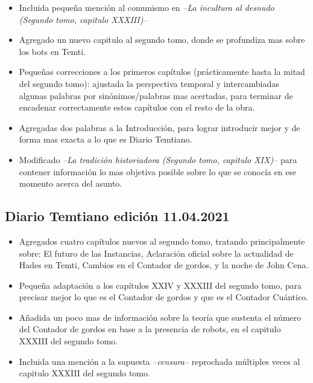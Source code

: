 \documentclass[
]{book}
\begin{document}
\begin{itemize}
\item[$\boxtimes$]
  Incluida pequeña mención al comunismo en \emph{--La incultura al desnudo (Segundo tomo, capitulo XXXIII)--}
\item[$\boxtimes$]
  Agregado un nuevo capitulo al segundo tomo, donde se profundiza mas sobre los bots en Temti.
\item[$\boxtimes$]
  Pequeñas correcciones a los primeros capítulos (prácticamente hasta la mitad del segundo tomo): ajustada la perspectiva temporal y intercambiadas algunas palabras por sinónimos/palabras mas acertadas, para terminar de encadenar correctamente estos capítulos con el resto de la obra.
\item[$\boxtimes$]
  Agregadas dos palabras a la Introducción, para lograr introducir mejor y de forma mas exacta a lo que es Diario Temtiano.
\item[$\boxtimes$]
  Modificado \emph{--La tradición historiadora (Segundo tomo, capitulo XIX)--} para contener información lo mas objetiva posible sobre lo que se conocía en ese momento acerca del asunto.
\end{itemize}

\hypertarget{diario-temtiano-ediciuxf3n-11.04.2021}{%
\subsection*{Diario Temtiano edición 11.04.2021}\label{diario-temtiano-ediciuxf3n-11.04.2021}}

\begin{itemize}
\item[$\boxtimes$]
  Agregados cuatro capítulos nuevos al segundo tomo, tratando principalmente sobre: El futuro de las Instancias, Aclaración oficial sobre la actualidad de Hades en Temti, Cambios en el Contador de gordos, y la noche de John Cena.
\item[$\boxtimes$]
  Pequeña adaptación a los capítulos XXIV y XXXIII del segundo tomo, para precisar mejor lo que es el Contador de gordos y que es el Contador Cuántico.
\item[$\boxtimes$]
  Añadida un poco mas de información sobre la teoría que sustenta el número del Contador de gordos en base a la presencia de robots, en el capitulo XXXIII del segundo tomo.
\item[$\boxtimes$]
  Incluida una mención a la supuesta \emph{--censura--} reprochada múltiples veces al capitulo XXXIII del segundo tomo.
\end{itemize}
\end{document}
